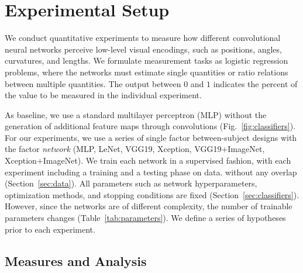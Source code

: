 
\section{Experimental Setup}

We conduct quantitative experiments to measure how different convolutional neural networks perceive low-level visual encodings, such as positions, angles, curvatures, and lengths. We formulate measurement tasks as logistic regression problems, where the networks must estimate single quantities or ratio relations between multiple quantities. The output between $0$ and $1$ indicates the percent of the value to be measured in the individual experiment. 


As baseline, we use a standard multilayer perceptron (MLP) without the generation of additional feature maps through convolutions (Fig.~\ref{fig:classifiers}).
For our experiments, we use a series of single factor between-subject designs with the factor \emph{network} (MLP, LeNet, VGG19, Xception, VGG19+ImageNet, Xception+ImageNet). We train each network in a supervised fashion, with each experiment including a training and a testing phase on data. without any overlap (Section~\ref{sec:data}). All parameters such as network hyperparameters, optimization methods, and stopping conditions are fixed (Section~\ref{sec:classifiers}). However, since the networks are of different complexity, the number of trainable parameters changes (Table~\ref{tab:parameters}). We define a series of hypotheses prior to each experiment.

\subsection{Measures and Analysis}

